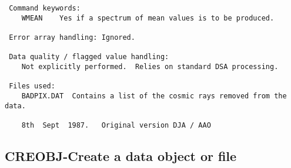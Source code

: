 \begin{description}
\begin{verbatim}
 Command keywords:
    WMEAN    Yes if a spectrum of mean values is to be produced.

 Error array handling: Ignored.

 Data quality / flagged value handling:
    Not explicitly performed.  Relies on standard DSA processing.

 Files used:
    BADPIX.DAT  Contains a list of the cosmic rays removed from the data.

    8th  Sept  1987.   Original version DJA / AAO
\end{verbatim}
\end{description}
\subsection{CREOBJ-\label{CREOBJ}Create a data object or file}
